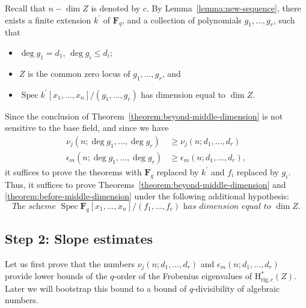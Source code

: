 \documentclass{amsart}
\numberwithin{equation}{section}
\theoremstyle{plain}
\theoremstyle{definition}
\renewcommand{\mathbb}{\mathbf}
\begin{document}
Recall that \(n - \dim Z\) is denoted by \(c\).
By Lemma~\ref{lemma:new-sequence}, there exists a finite extension \(k^{\prime}\) of
\(\mathbb{F}_q\), and a collection of polynomials \(g_1,\ldots,g_r\),
such that
\begin{itemize}
\item \(\deg g_1=d_1\), \(\deg g_i \leq d_i\);
\item \(Z\) is the common zero locus of \(g_1,\ldots,g_r\), and
\item
\(\operatorname{Spec}k^{\prime}[x_1,\ldots,x_n]/(g_1,\ldots,g_c)\) has
dimension equal to \(\dim Z\).
\end{itemize}


Since the conclusion of Theorem~\ref{theorem:beyond-middle-dimension}
is not sensitive to the base field, and since we have
\begin{align*}
  \nu_j(n;\deg g_1,\ldots,\deg g_r) & \geq \nu_j(n;d_1,\ldots,d_r)\\
  \epsilon_{m}(n;\deg g_1,\ldots,\deg g_r) &\geq \epsilon_{m}(n;d_1,\ldots,d_r),
\end{align*}
it suffices to prove the theorems with \(\mathbb{F}_q\) replaced by \(k^{\prime}\) and
\(f_i\) replaced by \(g_i\). Thus, it suffices to prove
Theorems~\ref{theorem:beyond-middle-dimension} and \ref{theorem:before-middle-dimension}
under the following additional hypothesis:
\begin{equation}\label{eq:hypothesis}
  \textit{The scheme \(\operatorname{Spec}\mathbb{F}_q[x_1,\ldots,x_n]/(f_1,\ldots,f_c)\) has dimension equal to \(\dim Z\).}
\end{equation}

\subsection*{Step 2: Slope estimates}
Let us first prove that the numbers \(\nu_{j}(n; d_1,\ldots,d_r)\) and
\(\epsilon_{m}(n;d_1,\ldots,d_r)\) provide
lower bounds of the \(q\)-order of the Frobenius eigenvalues of
\(\mathrm{H}^{\ast}_{\mathrm{rig},c}(Z)\). Later we will bootstrap this bound
to a bound of \(q\)-divisibility of algebraic numbers.
\end{document}
